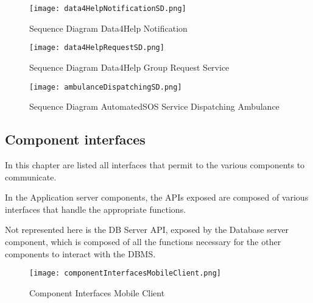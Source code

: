 \documentclass[../main.tex]{subfiles}
\begin{document}
\vspace*{2cm}

\begin{figure}[H]
        \centering
             \texttt{[image: data4HelpNotificationSD.png]}
              \caption{Sequence Diagram Data4Help Notification  }
               \label{fig:data4HelpSD}
\end{figure}

\vspace*{2cm}

\begin{figure}[H]
        \centering
             \texttt{[image: data4HelpRequestSD.png]}
              \caption{Sequence Diagram Data4Help Group Request Service }
               \label{fig:data4HelpRequestSD}
\end{figure}

\vspace*{2cm}

\begin{figure}[H]
        \centering
             \texttt{[image: ambulanceDispatchingSD.png]}
              \caption{Sequence Diagram AutomatedSOS Service Dispatching Ambulance}
               \label{fig:ambulanceDispatchingSD}
\end{figure}

\subsection{Component interfaces}

In this chapter are listed all interfaces that permit to the various components to communicate.

In the Application server components, the APIs exposed are composed of various interfaces that handle the appropriate functions.

Not represented here is the DB Server API, exposed by the Database server component, which is composed of all the functions necessary for the other components to interact with the DBMS.

\begin{figure}[H]
        \centering
             \texttt{[image: componentInterfacesMobileClient.png]}
              \caption{Component Interfaces Mobile Client }
               \label{fig:componentInterfacesMobileClient}
\end{figure}

\vspace*{2cm}
\end{document}
